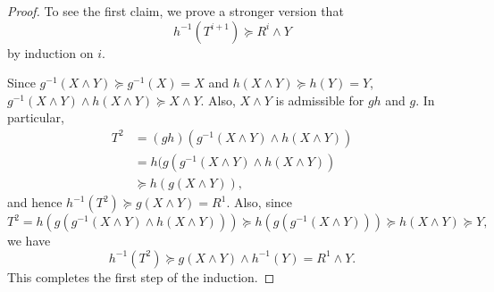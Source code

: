 \documentclass[12pt,reqno]{amsart}
\theoremstyle{plain}
\theoremstyle{definition}
\theoremstyle{remark}
\numberwithin{equation}{section}
\begin{document}
\begin{proof} 
	To see the first claim, 
        we prove a stronger version that  
        \begin{equation*} 
       		h^{-1}(T^{i+1}) \succeq R^{i} \wedge Y 
	\end{equation*} 
        by induction on $i$.  
        
        Since  $g^{-1}(X \wedge Y) \succeq g^{-1}(X) = X$  and  
        $h(X \wedge Y) \succeq h(Y) = Y$,  
        $g^{-1}(X \wedge Y) \wedge h(X \wedge Y) \succeq X \wedge Y$.  
        Also, 
        $X \wedge Y$  is admissible for  $gh$  and  $g$.  
        In particular, 
        \begin{align*} 
	        T^2 
	        & = (gh)(g^{-1} (X \wedge Y) \wedge h(X \wedge Y)) \\ 
	        & = h(g(g^{-1} (X \wedge Y) \wedge h(X \wedge Y)) \\ 
	        & \succeq h(g(X \wedge Y)), 
        \end{align*} 
        and hence  $h^{-1}(T^2) \succeq g(X \wedge Y) = R^1$.  
        Also, 
        since  
        \begin{equation*} 
		T^2 = h(g(g^{-1} (X \wedge Y) \wedge h(X \wedge Y))) 
		\succeq h(g(g^{-1}(X \wedge Y))) 
		\succeq h(X \wedge Y) 
		\succeq Y,   
        \end{equation*} 
        we have 
        \begin{equation}\label{Eq:Y} 
	        h^{-1}(T^2) \succeq  g (X \wedge Y) \wedge h^{-1}(Y) = R^1 \wedge Y.  
        \end{equation} 
        This completes the first step of the induction. 
        

\end{proof}
\end{document}
